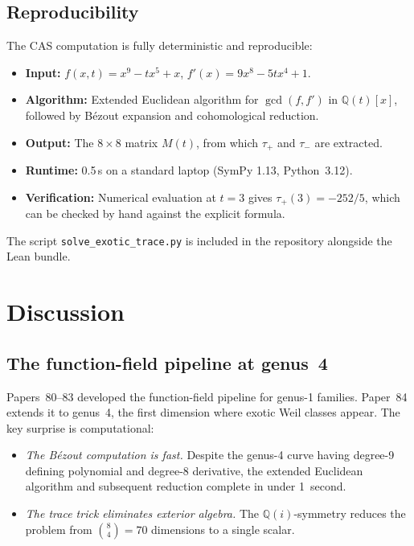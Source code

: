 \documentclass[11pt]{article}
\theoremstyle{plain}
\theoremstyle{definition}
\theoremstyle{remark}
\newcommand{\Q}{\mathbb{Q}}
\begin{document}
\subsection{Reproducibility}

The CAS computation is fully deterministic and reproducible:
\begin{itemize}[nosep]
\item \textbf{Input:} $f(x,t) = x^9 - tx^5 + x$, $f'(x) = 9x^8 - 5tx^4 + 1$.
\item \textbf{Algorithm:} Extended Euclidean algorithm for $\gcd(f, f')$
  in $\Q(t)[x]$, followed by B\'ezout expansion and cohomological reduction.
\item \textbf{Output:} The $8 \times 8$ matrix $M(t)$, from which $\tau_+$
  and $\tau_-$ are extracted.
\item \textbf{Runtime:} 0.5\,s on a standard laptop (SymPy 1.13,
  Python~3.12).
\item \textbf{Verification:} Numerical evaluation at $t = 3$ gives
  $\tau_+(3) = -252/5$, which can be checked by hand against the
  explicit formula.
\end{itemize}
The script \texttt{solve\_exotic\_trace.py} is included in the repository
alongside the Lean bundle.

\section{Discussion}

\subsection{The function-field pipeline at genus~4}

Papers~80--83 developed the function-field pipeline for genus-1 families.
Paper~84 extends it to genus~4, the first dimension where exotic Weil
classes appear. The key surprise is computational:

\begin{itemize}[nosep]
\item \emph{The B\'ezout computation is fast.} Despite the genus-4 curve
  having degree-9 defining polynomial and degree-8 derivative, the
  extended Euclidean algorithm and subsequent reduction complete in
  under 1~second.
\item \emph{The trace trick eliminates exterior algebra.} The
  $\Q(i)$-symmetry reduces the problem from $\binom{8}{4} = 70$ dimensions
  to a single scalar.
\end{itemize}
\end{document}
